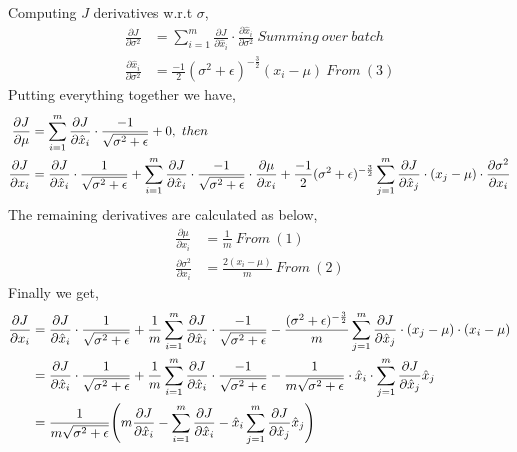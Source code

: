 \documentclass{article}
\begin{document}
Computing $J$ derivatives w.r.t $\sigma$,
\begin{align*}
    \frac{\partial J}{\partial \sigma^2} &= \sum_{i=1}^{m}\frac{\partial J}{\partial \hat{x}_i}\cdot\frac{\partial \hat{x}_i}{\partial \sigma^2}\ Summing\ over\ batch\\
    \frac{\partial \hat{x}_i}{\partial \sigma^2} & = \frac{-1}{2}(\sigma^2 + \epsilon)^{-\frac{3}{2}}(x_i-\mu)\ From\ (3)
\end{align*}
Putting everything together we have,
\begin{align*}
    \frac{\partial J}{\partial \mu} &=  \sum_{i=1}^{m} \frac{\partial J}{\partial \hat{x}_i}\cdot\frac{-1}{\sqrtsign{\sigma^2 + \epsilon}} + 0,\ then \\   
    \frac{\partial J}{\partial x_i} &= \frac{\partial J}{\partial \hat{x}_i}\cdot \frac{1}{\sqrtsign{\sigma^2 + \epsilon}} +   \sum_{i=1}^{m} \frac{\partial J}{\partial \hat{x}_i}\cdot\frac{-1}{\sqrtsign{\sigma^2 + \epsilon}}\cdot\frac{\partial \mu}{\partial x_i} + \frac{-1}{2}(\sigma^2 + \epsilon)^{-\frac{3}{2}}\sum_{j=1}^{m}\frac{\partial J}{\partial \hat{x}_j}\cdot(x_j-\mu)\cdot\frac{\partial \sigma^2}{\partial x_i}
\end{align*}
The remaining derivatives are calculated as below,
\begin{align*}
    \frac{\partial \mu}{\partial x_i} &= \frac{1}{m}\ From\ (1)\\
    \frac{\partial \sigma^2}{\partial x_i} &= \frac{2(x_i-\mu)}{m}\ From\ (2)
\end{align*}
Finally we get,
\begin{align*}
    \frac{\partial J}{\partial x_i} &= \frac{\partial J}{\partial \hat{x}_i}\cdot \frac{1}{\sqrtsign{\sigma^2 + \epsilon}} +  \frac{1}{m}\sum_{i=1}^{m} \frac{\partial J}{\partial \hat{x}_i}\cdot\frac{-1}{\sqrtsign{\sigma^2 + \epsilon}} - \frac{(\sigma^2 + \epsilon)^{-\frac{3}{2}}}{m}\sum_{j=1}^{m}\frac{\partial J}{\partial \hat{x}_j}\cdot(x_j-\mu)\cdot(x_i-\mu)\\
     &= \frac{\partial J}{\partial \hat{x}_i}\cdot \frac{1}{\sqrtsign{\sigma^2 + \epsilon}} +  \frac{1}{m}\sum_{i=1}^{m} \frac{\partial J}{\partial \hat{x}_i}\cdot\frac{-1}{\sqrtsign{\sigma^2 + \epsilon}} - \frac{1}{m\sqrtsign{\sigma^2 + \epsilon}}\cdot\hat{x}_i\cdot\sum_{j=1}^{m}\frac{\partial J}{\partial \hat{x}_j}\hat{x}_j\\
     &= \frac{1}{m\sqrtsign{\sigma^2 + \epsilon}}\Biggl(m\frac{\partial J}{\partial \hat{x}_i} - \sum_{i=1}^{m} \frac{\partial J}{\partial \hat{x}_i}-\hat{x}_i\sum_{j=1}^{m}\frac{\partial J}{\partial \hat{x}_j}\hat{x}_j\Biggr)
\end{align*}
\end{document}
